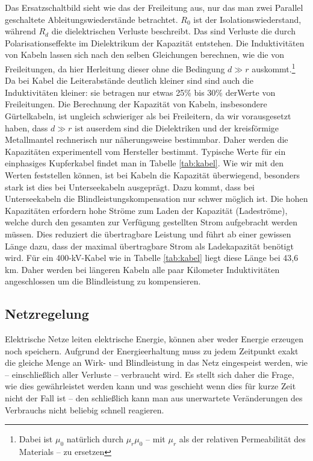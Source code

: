 Das Ersatzschaltbild sieht wie das der Freileitung aus, nur das man zwei Parallel geschaltete Ableitungswiederstände betrachtet.
$R_0$ ist der Isolationswiederstand, während $R_d$ die dielektrischen Verluste beschreibt. Das sind Verluste die durch Polarisationseffekte im Dielektrikum der Kapazität entstehen.
Die Induktivitäten von Kabeln lassen sich nach den selben Gleichungen berechnen, wie die von Freileitungen, da hier Herleitung dieser ohne die Bedingung $d\gg r$ auskommt.\footnote{Dabei ist $\mu_0$ natürlich durch $\mu_r\mu_0$ – mit $\mu_r$ als der relativen Permeabilität des Materials – zu ersetzen} %
Da bei Kabel die Leiterabstände deutlich kleiner sind sind auch die Induktivitäten kleiner: sie betragen nur etwas 25\% bis 30\% derWerte von Freileitungen\cite{Flosdorff}.
Die Berechnung der Kapazität von Kabeln, insbesondere Gürtelkabeln, ist ungleich schwieriger als bei Freileitern, da wir vorausgesetzt haben, dass $d\gg r$ ist auserdem sind die Dielektriken und der kreisförmige Metallmantel rechnerisch nur näherungsweise bestimmbar. Daher werden die Kapazitäten experimentell vom Hersteller bestimmt.\cite{Flosdorff}
Typische Werte für ein einphasiges Kupferkabel findet man in Tabelle \ref{tab:kabel}.
Wie wir mit den Werten feststellen können, ist bei Kabeln die Kapazität überwiegend,
besonders stark ist dies bei Unterseekabeln ausgeprägt. %
Dazu kommt, dass bei Unterseekabeln die Blindleistungskompensation nur schwer möglich ist.
Die hohen Kapazitäten erfordern hohe Ströme zum Laden der Kapazität (Ladeströme), welche durch den gesamten zur Verfügung gestellten Strom aufgebracht werden müssen. Dies reduziert die übertragbare Leistung und führt ab einer gewissen Länge dazu, dass der maximal übertragbare Strom als Ladekapazität benötigt wird. %
Für ein 400-kV-Kabel wie in Tabelle \ref{tab:kabel} liegt diese Länge bei 43,6 km.
Daher werden bei längeren Kabeln alle paar Kilometer %
Induktivitäten angeschlossen um die Blindleistung zu kompensieren.

\subsection{Netzregelung}
Elektrische Netze leiten elektrische Energie, können aber weder Energie erzeugen noch speichern.
Aufgrund der Energieerhaltung muss zu jedem Zeitpunkt exakt die gleiche Menge an Wirk- und Blindleistung in das Netz eingespeist werden, wie – einschließlich aller Verluste – verbraucht wird.
Es stellt sich daher die Frage, wie dies gewährleistet werden kann und was geschieht wenn dies für kurze Zeit nicht der Fall ist – den schließlich kann man aus unerwartete Veränderungen des Verbrauchs nicht beliebig schnell reagieren.

